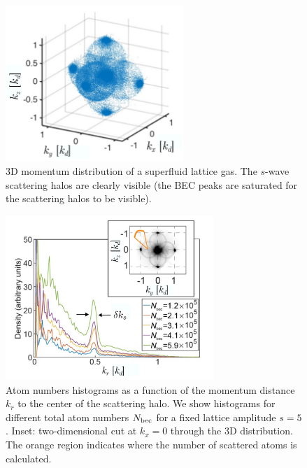 \begin{figure}
    \centering
    \includegraphics[width=0.6\textwidth]{Fig/Chapter3/spheres.png}
    \caption[Scattering halos in the 3D momentum distribution of a superfluid lattice gas]{3D momentum distribution of a superfluid lattice gas. The $s$-wave scattering halos are clearly visible (the BEC peaks are saturated for the scattering halos to be visible).}
    \label{fig:spheres}
\end{figure}

\begin{figure}
    \centering
    \includegraphics[width=0.7\textwidth]{Fig/Chapter3/sphere_profiles.png}
    \caption[Atom numbers histograms as a function of the momentum distance $k_r$ to the center of the scattering halo]{Atom numbers histograms as a function of the momentum distance $k_r$ to the center of the scattering halo. We show histograms for different total atom numbers $N_{\rm{bec}}$ for a fixed lattice amplitude $s=5$. Inset: two-dimensional cut at $k_x=0$ through the 3D distribution. The orange region indicates where the number of scattered atoms is calculated.}
    \label{fig:sphere_profiles}
\end{figure}

